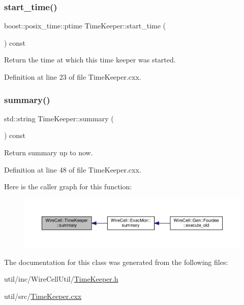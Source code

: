 \mbox{\label{class_wire_cell_1_1_time_keeper_acbe86e72c4991e0bd5143a59580c5e82}} 
\subsubsection{\texorpdfstring{start\+\_\+time()}{start\_time()}}
{\footnotesize\ttfamily boost\+::posix\+\_\+time\+::ptime Time\+Keeper\+::start\+\_\+time (\begin{DoxyParamCaption}{ }\end{DoxyParamCaption}) const}



Return the time at which this time keeper was started. 



Definition at line 23 of file Time\+Keeper.\+cxx.

\mbox{\label{class_wire_cell_1_1_time_keeper_a20b7fb14f514bd61e53c77f5cb035e47}} 
\subsubsection{\texorpdfstring{summary()}{summary()}}
{\footnotesize\ttfamily std\+::string Time\+Keeper\+::summary (\begin{DoxyParamCaption}{ }\end{DoxyParamCaption}) const}



Return summary up to now. 



Definition at line 48 of file Time\+Keeper.\+cxx.

Here is the caller graph for this function\+:
\nopagebreak
\begin{figure}[H]
\begin{center}
\leavevmode
\includegraphics[width=350pt]{class_wire_cell_1_1_time_keeper_a20b7fb14f514bd61e53c77f5cb035e47_icgraph}
\end{center}
\end{figure}


The documentation for this class was generated from the following files\+:\begin{DoxyCompactItemize}
\item 
util/inc/\+Wire\+Cell\+Util/\hyperlink{_time_keeper_8h}{Time\+Keeper.\+h}\item 
util/src/\hyperlink{_time_keeper_8cxx}{Time\+Keeper.\+cxx}\end{DoxyCompactItemize}
